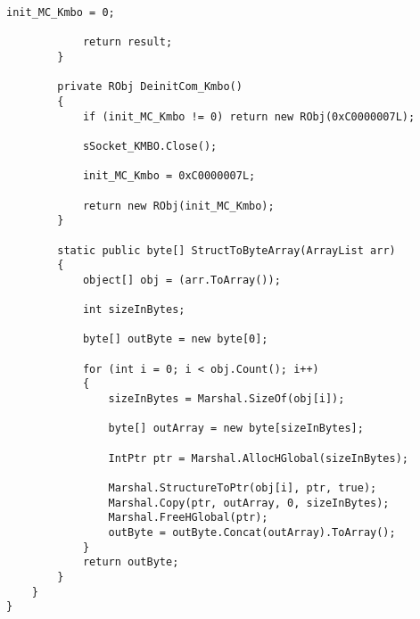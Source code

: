 \begin{lstlisting}[label=mc,caption=Основные функции взаимодействия с MC]
			init_MC_Kmbo = 0;
			
			return result;
		}
		
		private RObj DeinitCom_Kmbo()
		{
			if (init_MC_Kmbo != 0) return new RObj(0xC0000007L);
			
			sSocket_KMBO.Close();
			
			init_MC_Kmbo = 0xC0000007L;
			
			return new RObj(init_MC_Kmbo);
		}
		
		static public byte[] StructToByteArray(ArrayList arr)
		{
			object[] obj = (arr.ToArray());
			
			int sizeInBytes;
			
			byte[] outByte = new byte[0];
			
			for (int i = 0; i < obj.Count(); i++)
			{
				sizeInBytes = Marshal.SizeOf(obj[i]);
				
				byte[] outArray = new byte[sizeInBytes];
				
				IntPtr ptr = Marshal.AllocHGlobal(sizeInBytes);
				
				Marshal.StructureToPtr(obj[i], ptr, true);
				Marshal.Copy(ptr, outArray, 0, sizeInBytes);
				Marshal.FreeHGlobal(ptr);
				outByte = outByte.Concat(outArray).ToArray();
			}
			return outByte;
		}
	}
}
\end{lstlisting}